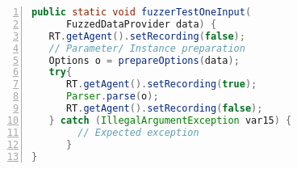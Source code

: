 \begin{lstlisting}[float=t,language=Java,caption={Conceptual decompiled harness showing selective coverage instrumentation through runtime control of JaCoCo's recording state. The coverage handling calls are added using offline instrumentation after compilation.},label={lst:coverage-tracking},float=htbp,basicstyle=\small\ttfamily,numbers=left,numberstyle=\tiny\color{gray},frame=single]
public static void fuzzerTestOneInput(
      FuzzedDataProvider data) {
   RT.getAgent().setRecording(false); 
   // Parameter/ Instance preparation
   Options o = prepareOptions(data);
   try{
      RT.getAgent().setRecording(true);
      Parser.parse(o);
      RT.getAgent().setRecording(false);
   } catch (IllegalArgumentException var15) {
        // Expected exception 
      }
}
\end{lstlisting}
